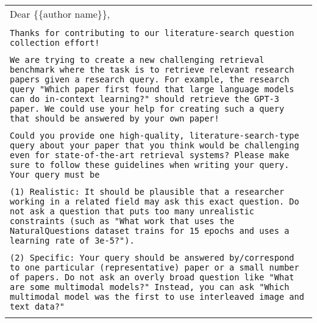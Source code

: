 \begin{table*}[h]
    \centering
    \small
    \begin{tabular}{>{\raggedright\arraybackslash\tt}p{}<{}}
        \toprule
            \vspace{-1em}

Dear \{\{author name\}\}, \\ \\

Thanks for contributing to our literature-search question collection effort!  \\ \\

We are trying to create a new challenging retrieval benchmark where the task is to retrieve relevant research papers given a research query. For example, the research query "Which paper first found that large language models can do in-context learning?" should retrieve the GPT-3 paper. We could use your help for creating such a query that should be answered by your own paper! \\ \\

Could you provide one high-quality, literature-search-type query about your paper that you think would be challenging even for state-of-the-art retrieval systems? Please make sure to follow these guidelines when writing your query. Your query must be \\ \\

(1) Realistic: It should be plausible that a researcher working in a related field may ask this exact question. Do not ask a question that puts too many unrealistic constraints (such as "What work that uses the NaturalQuestions dataset trains for 15 epochs and uses a learning rate of 3e-5?"). \\ \\

(2) Specific: Your query should be answered by/correspond to one particular (representative) paper or a small number of papers. Do not ask an overly broad question like "What are some multimodal models?" Instead, you can ask "Which multimodal model was the first to use interleaved image and text data?" \\ \\


\end{tabular}
\end{table*}

